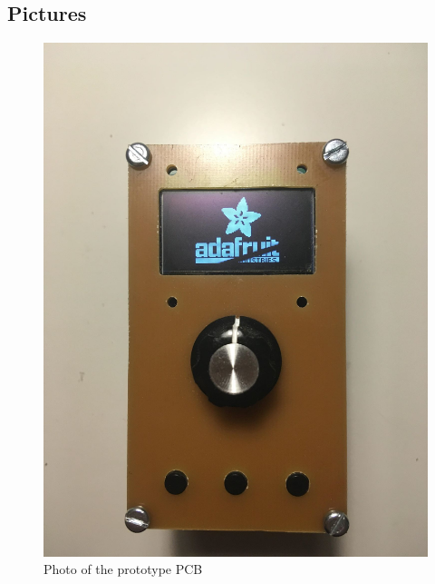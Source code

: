 \documentclass{article}
\begin{document}
 \subsection{Pictures}
  \begin{figure}[H]
  	\centering
  	\includegraphics[width=1\linewidth]{IMG_2388.jpg}
  	\caption{Photo of the prototype PCB}
 	 \label{fig:HIDpic}
\end{figure}
\end{document}
